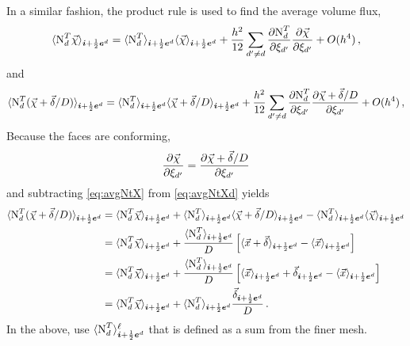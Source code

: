 In a similar fashion, the product rule is used to find the average volume flux,
\begin{equation}
  \avg{\NrmT_d\vec{\chi}}_{\hhstep{+}} = \avg{\NrmT_d}_{\hhstep{+}}\avg{\vec{\chi}}_{\hhstep{+}} + \frac{h^2}{12}\sum_{d'\ne d}\fpartial{\NrmT_d}{\xi_{d'}}{1}\fpartial{\vec{\chi}}{\xi_{d'}}{1} + O(h^4)\,,
  \label{eq:avgNtX}
\end{equation}
and
\begin{equation}
  \avg{\NrmT_d(\vec{\chi} + \vec{\delta}/D)}_{\hhstep{+}} = \avg{\NrmT_d}_{\hhstep{+}}\avg{\vec{\chi} + \vec{\delta}/D}_{\hhstep{+}} + \frac{h^2}{12}\sum_{d'\ne d}\fpartial{\NrmT_d}{\xi_{d'}}{1}\fpartial{\vec{\chi} + \vec{\delta}/D}{\xi_{d'}}{1} + O(h^4)\,,
  \label{eq:avgNtXd}
\end{equation}
Because the faces are conforming,
\begin{equation*}
  \fpartial{\vec{\chi}}{\xi_{d'}}{1} = \fpartial{\vec{\chi} + \vec{\delta}/D}{\xi_{d'}}{1}
\end{equation*}
and subtracting \eqref{eq:avgNtX} from \eqref{eq:avgNtXd} yields
\begin{align*}
  \avg{\NrmT_d(\vec{\chi} + \vec{\delta}/D)}_{\hhstep{+}} &= \avg{\NrmT_d\vec{\chi}}_{\hhstep{+}} + \avg{\NrmT_d}_{\hhstep{+}}\avg{\vec{\chi} + \vec{\delta}/D}_{\hhstep{+}} - \avg{\NrmT_d}_{\hhstep{+}}\avg{\vec{\chi}}_{\hhstep{+}}\\
  &= \avg{\NrmT_d\vec{\chi}}_{\hhstep{+}} +  \frac{\avg{\NrmT_d}_{\hhstep{+}}}{D}\left[\avg{\vecx + \vec{\delta}}_{\hhstep{+}} - \avg{\vecx}_{\hhstep{+}}\right]\\
  &= \avg{\NrmT_d\vec{\chi}}_{\hhstep{+}} +  \frac{\avg{\NrmT_d}_{\hhstep{+}}}{D}\left[\avg{\vecx}_{\hhstep{+}} + \vec{\delta}_{\hhstep{+}} - \avg{\vecx}_{\hhstep{+}}\right]\\
  &= \avg{\NrmT_d\vec{\chi}}_{\hhstep{+}} +  \avg{\NrmT_d}_{\hhstep{+}}\frac{\vec{\delta}_{\hhstep{+}}}{D}\,.
\end{align*}
In the above, use $\avg{\NrmT_d}_{\hhstep{+}}^{\ell}$ that is defined as a sum from the finer mesh.

\ifx\havefulldoc\undefined

\fi